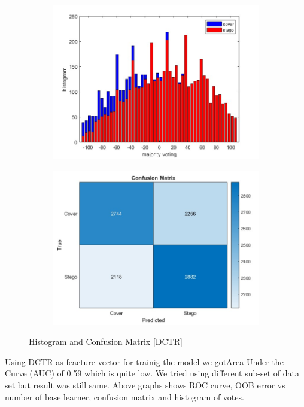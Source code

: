 \begin{figure}[H]
    \begin{subfigure}[b]{0.5\textwidth}
        \includegraphics[width=\textwidth]{img/histoDctr.jpg}
    \end{subfigure}
    \hfill
    \begin{subfigure}[b]{0.5\textwidth}
        \includegraphics[width=\textwidth]{img/confusiondctr.jpg}
    \end{subfigure}
    \caption{Histogram and Confusion Matrix [DCTR]}
\end{figure}
Using DCTR as feacture vector for trainig the model we gotArea Under the Curve (AUC) of 0.59 which is quite low. We tried using different sub-set of data set but result was still same. Above graphs shows ROC curve, OOB error vs number of base learner, confusion matrix and histogram of votes.
\clearpage

